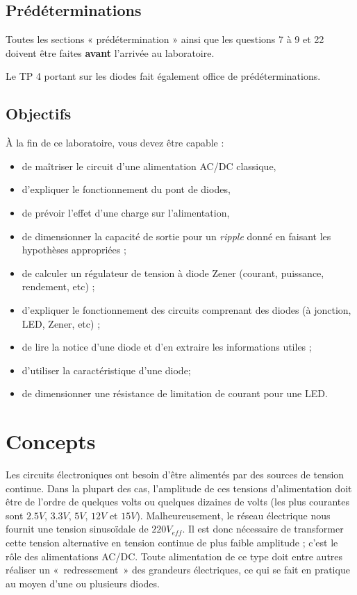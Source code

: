 \documentclass{../template/labo}
\begin{document}
\subsection{Prédéterminations}
Toutes les sections « prédétermination » ainsi que les questions 7 à 9 et 22 doivent être faites \textbf{avant} l'arrivée au laboratoire.

Le TP 4 portant sur les diodes fait également office de prédéterminations.


\subsection{Objectifs}
À la fin de ce laboratoire, vous devez être capable :
\begin{itemize}
\item de maîtriser le circuit d'une alimentation AC/DC classique,
\item d'expliquer le fonctionnement du pont de diodes,
\item de prévoir l'effet d'une charge sur l'alimentation,
\item de dimensionner la capacité de sortie pour un \textit{ripple} donné en faisant les hypothèses appropriées ;
\item de calculer un régulateur de tension à diode Zener (courant, puissance, rendement, etc) ;
\item d'expliquer le fonctionnement des circuits comprenant des diodes (à jonction, LED, Zener, etc) ;
\item de lire la notice d'une diode et d'en extraire les informations utiles ;
\item d'utiliser la caractéristique d'une diode;
\item de dimensionner une résistance de limitation de courant pour une LED.
\end{itemize}
\newpage
\pagestyle{fancy}

\section{Concepts}
Les circuits électroniques ont besoin d'être alimentés par des sources de tension continue. Dans la plupart des cas, l'amplitude de ces tensions d'alimentation doit être de l'ordre de quelques volts ou quelques dizaines de volts (les plus courantes sont $2.5V$, $3.3V$, $5V$, $12V$ et $15V$).
Malheureusement, le réseau électrique nous fournit une tension sinusoïdale de $220V_{eff}$. Il est donc nécessaire de transformer cette tension alternative en tension continue de plus faible amplitude ; c'est le rôle des alimentations AC/DC.
Toute alimentation de ce type doit entre autres réaliser un «~redressement~» des grandeurs électriques, ce qui se fait en pratique au moyen d'une ou plusieurs diodes.
 
\end{document}
